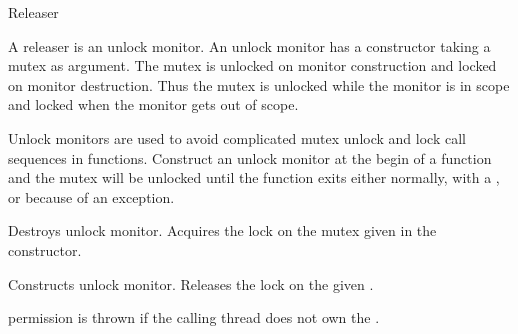 
\begin{classpage}{Releaser}

A releaser is an unlock monitor. An unlock monitor has
a constructor taking a mutex as argument. The mutex is unlocked on
monitor construction and locked on monitor destruction. Thus the mutex
is unlocked while the monitor is in scope and locked when the monitor
gets out of scope.

Unlock monitors are used to avoid complicated mutex unlock and lock
call sequences in functions. Construct an unlock monitor at the begin
of a function and the mutex will be unlocked until the function exits
either normally, with a , or because of an exception.


\begin{mandescription}
  \destructor
  Destroys  unlock monitor. Acquires the lock on the mutex
  given in the constructor.

  Constructs  unlock monitor. Releases the lock on the given
  .
  \begin{exception}
    \item[permission] is thrown if the calling thread does not own the .
  \end{exception}
\end{mandescription}

\end{classpage}
